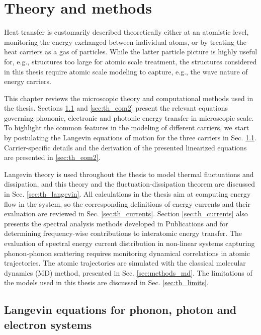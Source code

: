 \chapter{Theory and methods}
\label{chap:theory}

Heat transfer is customarily described theoretically either at an atomistic level, monitoring the energy exchanged between individual atoms, or by treating the heat carriers as a gas of particles. While the latter particle picture is highly useful for, e.g., structures too large for atomic scale treatment, the structures considered in this thesis require atomic scale modeling to capture, e.g., the wave nature of energy carriers.

This chapter reviews the microscopic theory and computational methods used in the thesis. Sections \ref{sec:th_eom1} and \ref{sec:th_eom2} present the relevant equations governing phononic, electronic and photonic energy transfer in microscopic scale. To highlight the common features in the modeling of different carriers, we start by postulating the Langevin equations of motion for the three carriers in Sec. \ref{sec:th_eom1}. Carrier-specific details and the derivation of the presented linearized equations are presented in \ref{sec:th_eom2}. 

Langevin theory is used throughout the thesis to model thermal fluctuations and dissipation, and this theory and the fluctuation-dissipation theorem are discussed in Sec. \ref{sec:th_langevin}. All calculations in the thesis aim at computing energy flow in the system, so the corresponding definitions of energy currents and their evaluation are reviewed in Sec. \ref{sec:th_currents}. Section \ref{sec:th_currents} also presents the spectral analysis methods developed in Publications  and  for determining frequency-wise contributions to interatomic energy transfer. The evaluation of spectral energy current distribution in non-linear systems capturing phonon-phonon scattering requires monitoring dynamical correlations in atomic trajectories. The atomic trajectories are simulated with the classical molecular dynamics (MD) method, presented in Sec. \ref{sec:methods_md}. The limitations of the models used in this thesis are discussed in Sec. \ref{sec:th_limits}.

\section{Langevin equations for phonon, photon and electron systems}
\label{sec:th_eom1}

